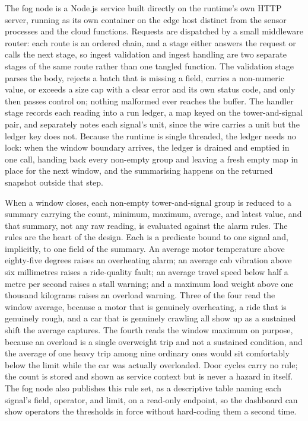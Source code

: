 \documentclass[conference]{IEEEtran}
\begin{document}
The fog node is a Node.js service built directly on the runtime's own HTTP server, running as its own container on the edge host distinct from the sensor processes and the cloud functions. Requests are dispatched by a small middleware router: each route is an ordered chain, and a stage either answers the request or calls the next stage, so ingest validation and ingest handling are two separate stages of the same route rather than one tangled function. The validation stage parses the body, rejects a batch that is missing a field, carries a non-numeric value, or exceeds a size cap with a clear error and its own status code, and only then passes control on; nothing malformed ever reaches the buffer. The handler stage records each reading into a run ledger, a map keyed on the tower-and-signal pair, and separately notes each signal's unit, since the wire carries a unit but the ledger key does not. Because the runtime is single threaded, the ledger needs no lock: when the window boundary arrives, the ledger is drained and emptied in one call, handing back every non-empty group and leaving a fresh empty map in place for the next window, and the summarising happens on the returned snapshot outside that step.

When a window closes, each non-empty tower-and-signal group is reduced to a summary carrying the count, minimum, maximum, average, and latest value, and that summary, not any raw reading, is evaluated against the alarm rules. The rules are the heart of the design. Each is a predicate bound to one signal and, implicitly, to one field of the summary. An average motor temperature above eighty-five degrees raises an overheating alarm; an average cab vibration above six millimetres raises a ride-quality fault; an average travel speed below half a metre per second raises a stall warning; and a maximum load weight above one thousand kilograms raises an overload warning. Three of the four read the window average, because a motor that is genuinely overheating, a ride that is genuinely rough, and a car that is genuinely crawling all show up as a sustained shift the average captures. The fourth reads the window maximum on purpose, because an overload is a single overweight trip and not a sustained condition, and the average of one heavy trip among nine ordinary ones would sit comfortably below the limit while the car was actually overloaded. Door cycles carry no rule; the count is stored and shown as service context but is never a hazard in itself. The fog node also publishes this rule set, as a descriptive table naming each signal's field, operator, and limit, on a read-only endpoint, so the dashboard can show operators the thresholds in force without hard-coding them a second time.
\end{document}
